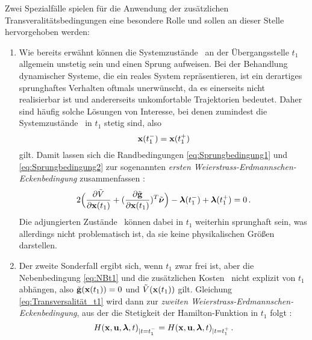 Zwei Spezialfälle spielen für die Anwendung der zusätzlichen Transveralitätsbedingungen eine besondere Rolle und sollen an dieser Stelle hervorgehoben werden: 
\begin{enumerate}
	\item Wie bereits erwähnt können die Systemzustände \xoft~an der Übergangsstelle $t_1$ allgemein unstetig sein und einen Sprung aufweisen. Bei der Behandlung dynamischer Systeme, die ein reales System repräsentieren, ist ein derartiges sprunghaftes Verhalten oftmals unerwünscht, da es einerseits nicht realisierbar ist und andererseits unkomfortable Trajektorien bedeutet. Daher sind häufig solche Lösungen von Interesse, bei denen zumindest die Systemzustände \xoft~in $t_1$ stetig sind, also 
	\begin{equation}
		\boldsymbol{\mathrm{x}}(t_1^-) = \boldsymbol{\mathrm{x}}(t_1^+) \label{eq:Stetigkeit_t1}
	\end{equation}
	gilt. Damit lassen sich die Randbedingungen \eqref{eq:Sprungbedingung1} und \eqref{eq:Sprungbedingung2} zur sogenannten \textit{ersten Weierstrass-Erdmannschen-Eckenbedingung} zusammenfassen \cite{Gerdts.2010}:
	\begin{equation}
		2\Big(\frac{\partial \tilde{V}}{\partial \boldsymbol{\mathrm{x}}(t_1)} + (\frac{\partial \tilde{\mathbf{g}}}{\partial \boldsymbol{\mathrm{x}}(t_1)})^T\tilde{\boldsymbol{\mathrm{\nu}}}\Big) - \boldsymbol{\mathrm{\lambda}}(t_1^-) + \boldsymbol{\mathrm{\lambda}}(t_1^+) = 0\,. \label{eq:WeierstrassErdmann1}
	\end{equation}
	Die adjungierten Zustände \lambdaoft~können dabei in $t_1$ weiterhin sprunghaft sein, was allerdings nicht problematisch ist, da sie keine physikalischen Größen darstellen.
	\item Der zweite Sonderfall ergibt sich, wenn $t_1$ zwar frei ist, aber die Nebenbedingung \eqref{eq:NBt1} und die zusätzlichen Kosten \Vofxoftone~nicht explizit von $t_1$ abhängen, also $\tilde{\mathbf{g}}(\boldsymbol{\mathrm{x}}(t_1)) = 0$ und $\tilde{V}(\boldsymbol{\mathrm{x}}(t_1))$ gilt. Gleichung \eqref{eq:Transversalität_t1} wird dann zur \textit{zweiten Weierstrass-Erdmannschen-Eckenbedingung}, aus der die Stetigkeit der Hamilton-Funktion in $t_1$ folgt \cite{Gerdts.2010}:
	\begin{equation}
	H(\boldsymbol{\mathrm{x}},\boldsymbol{\mathrm{u}},\boldsymbol{\mathrm{\lambda}},t)_{|t=t_1^-} = H(\boldsymbol{\mathrm{x}},\boldsymbol{\mathrm{u}},\boldsymbol{\mathrm{\lambda}},t)_{|t=t_1^+}\,. \label{eq:WeierstrassErdmann2}
	\end{equation}
\end{enumerate}
